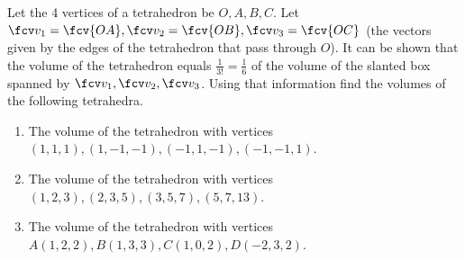 Let the 4 vertices of a tetrahedron be $O, A, B, C$. Let $\fcv v_1=\fcv{OA}, \fcv v_2=\fcv{OB}, \fcv v_3=\fcv{OC}$ (the vectors given by the edges of the tetrahedron that pass through $O$). It can be shown that the volume of the tetrahedron equals $\frac{1}{3! } =\frac{1}{6}$ of the volume of the slanted box spanned by $\fcv v_1, \fcv v_2, \fcv v_3$. Using that information find the volumes of the following tetrahedra.
\begin{enumerate}[ref={\fcProblemRef}]
\item The volume of the tetrahedron with vertices $(1,1,1), (1,-1,-1), (-1,1,-1), (-1,-1,1)$.
\item The volume of the tetrahedron with vertices $(1,2,3), (2,3,5), (3,5,7), (5,7,13)$.

\item \label{problemVolumeTetrahedronVertices(1,2,2)(1,3,3),(1,0,2),(-2,3,2)} The volume of the tetrahedron with vertices $A(1, 2,2 ), B(1,3,3),C(1,0,2),D(-2,3,2)$.
\end{enumerate}